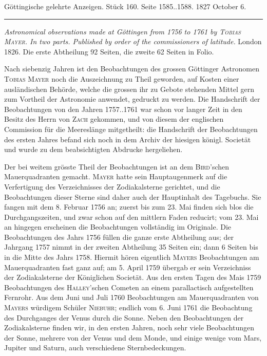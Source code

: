 \par\medskip
\hypertarget{native-649-lower}{}
\begin{center}\small Göttingische gelehrte Anzeigen. Stück 160. Seite 1585..1588. 1827 October 6.\\[3pt]\rule{.72\linewidth}{.3pt}\end{center}

\emph{Astronomical observations made at Göttingen from \textup{1756} to \textup{1761} by \textup{\textsc{Tobias Mayer}}. In two parts. Published by order of the commissioners of latitude.} London 1826. Die erste Abtheilung 92 Seiten, die zweite 62 Seiten in Folio.

Nach siebenzig Jahren ist den Beobachtungen des grossen Göttinger Astronomen \textsc{Tobias Mayer} noch die Auszeichnung zu Theil geworden, auf Kosten einer ausländischen Behörde, welche die grossen ihr zu Gebote stehenden Mittel gern zum Vortheil der Astronomie anwendet, gedruckt zu werden. Die Handschrift der Beobachtungen von den Jahren 1757..1761 war schon vor langer Zeit in den Besitz des Herrn von \textsc{Zach} gekommen, und von diesem der englischen Commission für die Meereslänge mitgetheilt: die Handschrift der Beobachtungen des ersten Jahres befand sich noch in dem Archiv der hiesigen königl. Societät und wurde zu dem beabsichtigten Abdrucke hergeliehen.

Der bei weitem grösste Theil der Beobachtungen ist an dem \textsc{Bird}'schen Mauerquadranten gemacht. \textsc{Mayer} hatte sein Hauptaugenmerk auf die Verfertigung des Verzeichnisses der Zodiakalsterne gerichtet, und die Beobachtungen dieser Sterne sind daher auch der Hauptinhalt des Tagebuchs. Sie fangen mit dem 8. Februar 1756 an; zuerst bis zum 23. Mai finden sich blos die Durchgangszeiten, und zwar schon auf den mittlern Faden reducirt; vom 23. Mai an hingegen erscheinen die Beobachtungen vollständig im Originale. Die Beobachtungen des Jahrs 1756 füllen die ganze erste Abtheilung aus; der Jahrgang 1757 nimmt in der zweiten Abtheilung 35 Seiten ein; dann 6 Seiten bis in die Mitte des Jahrs 1758. Hiermit hören eigentlich \textsc{Mayers} Beobachtungen am Mauerquadranten fast ganz auf; am 5. April 1759 übergab er sein Verzeichniss der Zodiakalsterne der Königlichen Societät. Aus den ersten Tagen des Mais 1759 Beobachtungen des \textsc{Halley}'schen Cometen an einem parallactisch aufgestellten Fernrohr. Aus dem Juni und Juli 1760 Beobachtungen am Mauerquadranten von \textsc{Mayers} würdigem Schüler \textsc{Niebuhr}; endlich vom 6. Juni 1761 die Beobachtung des Durchganges der Venus durch die Sonne. Neben den Beobachtungen der Zodiakalsterne finden wir, in den ersten Jahren, noch sehr viele Beobachtungen der Sonne, mehrere von der Venus und dem Monde, und einige wenige vom Mars, Jupiter und Saturn, auch verschiedene Sternbedeckungen.

